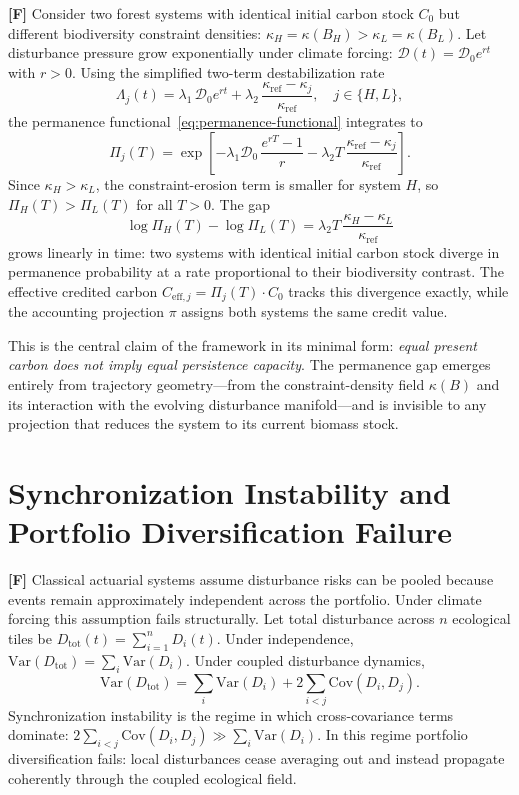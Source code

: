 \documentclass[12pt]{article}
\begin{document}
\textbf{[F]} Consider two forest systems with identical initial carbon stock $C_0$ but
different biodiversity constraint densities:
$\kappa_H = \kappa(B_H) > \kappa_L = \kappa(B_L)$.
Let disturbance pressure grow exponentially under climate forcing:
$\mathcal{D}(t) = \mathcal{D}_0 e^{rt}$ with $r>0$.
Using the simplified two-term destabilization rate
\begin{equation}
\Lambda_j(t)
= \lambda_1\,\mathcal{D}_0 e^{rt}
+ \lambda_2\,\frac{\kappa_\text{ref}-\kappa_j}{\kappa_\text{ref}},
\quad j\in\{H,L\},
\end{equation}
the permanence functional~\eqref{eq:permanence-functional} integrates to
\begin{equation}
\Pi_j(T)
= \exp\!\left[
-\lambda_1\mathcal{D}_0\,\frac{e^{rT}-1}{r}
-\lambda_2 T\,\frac{\kappa_\text{ref}-\kappa_j}{\kappa_\text{ref}}
\right].
\end{equation}
Since $\kappa_H > \kappa_L$, the constraint-erosion term is smaller for system $H$, so
$\Pi_H(T) > \Pi_L(T)$ for all $T>0$. The gap
\begin{equation}
\log\Pi_H(T) - \log\Pi_L(T)
= \lambda_2 T\,\frac{\kappa_H - \kappa_L}{\kappa_\text{ref}}
\end{equation}
grows linearly in time: two systems with identical initial carbon stock diverge in
permanence probability at a rate proportional to their biodiversity contrast. The
effective credited carbon
$C_{\text{eff},j} = \Pi_j(T)\cdot C_0$
tracks this divergence exactly, while the accounting projection $\pi$ assigns both
systems the same credit value.

This is the central claim of the framework in its minimal form: \emph{equal present
carbon does not imply equal persistence capacity}. The permanence gap emerges entirely
from trajectory geometry---from the constraint-density field $\kappa(B)$ and its
interaction with the evolving disturbance manifold---and is invisible to any projection
that reduces the system to its current biomass stock.

\section{Synchronization Instability and Portfolio Diversification Failure}

\textbf{[F]} Classical actuarial systems assume disturbance risks can be pooled because
events remain approximately independent across the portfolio. Under climate forcing this
assumption fails structurally. Let total disturbance across $n$ ecological tiles be
$D_\text{tot}(t) = \sum_{i=1}^n D_i(t)$. Under independence,
$\mathrm{Var}(D_\text{tot}) = \sum_i \mathrm{Var}(D_i)$.
Under coupled disturbance dynamics,
\begin{equation}
\label{eq:sync-var}
\mathrm{Var}(D_\text{tot})
= \sum_i \mathrm{Var}(D_i)
+ 2\sum_{i<j}\mathrm{Cov}(D_i,D_j).
\end{equation}
Synchronization instability is the regime in which cross-covariance terms dominate:
$2\sum_{i<j}\mathrm{Cov}(D_i,D_j) \gg \sum_i \mathrm{Var}(D_i)$. In this regime
portfolio diversification fails: local disturbances cease averaging out and instead
propagate coherently through the coupled ecological field.
\end{document}
